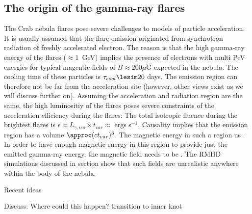 \subsection{The origin of the gamma-ray flares}

The Crab nebula flares pose severe challenges to models of particle acceleration. It is usually assumed that the flare emission originated from synchrotron radiation of freshly accelerated electron. The reason is that the high gamma-ray energy of the flares ($\approx 1$~GeV) implies the presence of electrons with multi PeV energies for typical magentic fields of $B \approx 200 \mu$G expected in the nebula. The cooling time of these particles is $\tau_{cool} \lesim 20$ days. The emission region can therefore not be far from the acceleration site (however, other views exist as we will discuss further on). Assuming the acceleration and radiation region are the same, the high luminositiy of the flares poses severe constraints of the acceleration efficiency during the flares: The total isotropic fluence during the brightest flares is $\epsilon \approx L_{\gamma,iso} \times t_{var} \approx $ ergs s$^{-1}$. Causality implies that the emission region has a volume $\approc (c t_{var})^3$. The magnetic energy in such a region us . In order to have enough magnetic energy in this region to provide just the emitted gamma-ray energy, the magnetic field needs to be . The RMHD simulations discussed in section show that such fields are unrealistic anywhere within the body of the nebula. 


Recent ideas  \cite{Bykov_2012}\cite{Cerutti_2014}\cite{2016arXiv160403179Y}\cite{2015arXiv151205426Z}\cite{2016arXiv160304850N}\cite{2016arXiv160305731L}

Discuss: Where could this happen? transition to inner knot